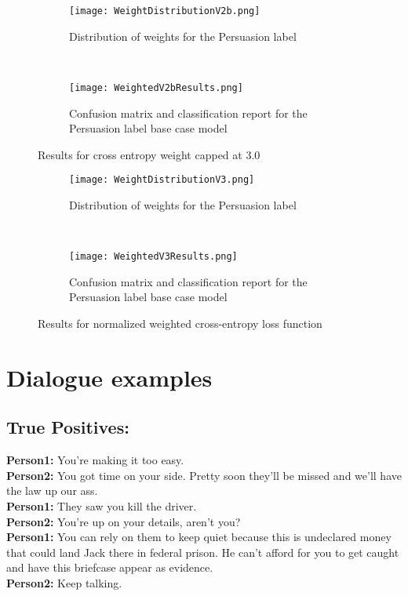 \documentclass[
	letterpaper, %
	12pt, %
	unnumberedsections, %
	twoside, %
]{LTJournalArticle}
\begin{document}
\begin{appendices}
	\begin{figure*}[t!]
		\centering
		\begin{subfigure}[t]{0.5\textwidth}
			\centering
			\texttt{[image: WeightDistributionV2b.png]}
			\caption{Distribution of weights for the Persuasion label}
			\label{fig:V2bWeightDistribution}
		\end{subfigure}%
		~
		\begin{subfigure}[t]{0.5\textwidth}
			\texttt{[image: WeightedV2bResults.png]}
			\caption{Confusion matrix and classification report for the Persuasion label base case model}
			\label{fig:V2bResults}
			\centering
		\end{subfigure}
		\caption{Results for cross entropy weight capped at 3.0}
	\end{figure*}


	\begin{figure*}[t!]
		\centering
		\begin{subfigure}[t]{0.5\textwidth}
			\centering
			\texttt{[image: WeightDistributionV3.png]}
			\caption{Distribution of weights for the Persuasion label}
			\label{fig:V3WeightDistribution}
		\end{subfigure}%
		~
		\begin{subfigure}[t]{0.5\textwidth}
			\texttt{[image: WeightedV3Results.png]}
			\caption{Confusion matrix and classification report for the Persuasion label base case model}
			\label{fig:V3Results}
			\centering
		\end{subfigure}
		\caption{Results for normalized weighted cross-entropy loss function}
	\end{figure*}
	\clearpage
	\section{Dialogue examples}\label{appendix:DialogueExamples}
	\subsection{True Positives:}
	{\ttfamily \tiny
		\noindent\textbf{Person1:}  You're making it too easy. \\
		\noindent\textbf{Person2:}  You got time on your side.  Pretty soon they'll be missed and we'll have the law up our ass. \\
		\noindent\textbf{Person1:}  They saw you kill the driver. \\
		\noindent\textbf{Person2:}  You're up on your details, aren't you? \\
		\noindent\textbf{Person1:}  You can rely on them to keep quiet because this is undeclared money that could land Jack there in federal prison.  He can't afford for you to get caught and have this briefcase appear as evidence. \\
		\noindent\textbf{Person2:}  Keep talking. \\

}
\end{appendices}
\end{document}
